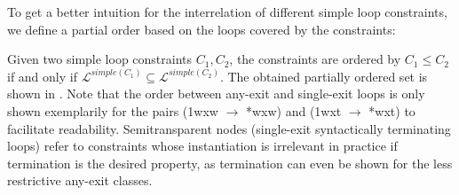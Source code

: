 To get a better intuition for the interrelation of different simple loop constraints, we define a partial order based on the loops covered by the constraints:

Given two simple loop constraints $C_1, C_2$, the constraints are ordered by $C_1 \le C_2$ if and only if $\mathcal{L}^{simple(C_1)} \subseteq \mathcal{L}^{simple(C_2)}$. The obtained partially ordered set is shown in . Note that the order between any-exit and single-exit loops is only shown exemplarily for the pairs (1wxw $\rightarrow$ *wxw) and (1wxt $\rightarrow$ *wxt) to facilitate readability. Semitransparent nodes (single-exit syntactically terminating loops) refer to constraints whose instantiation is irrelevant in practice if termination is the desired property, as termination can even be shown for the less restrictive any-exit classes.


